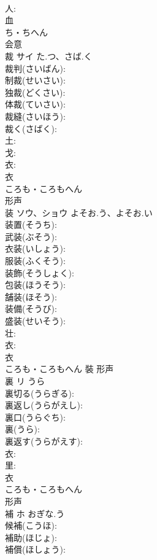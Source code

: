 \documentclass[8pt]{extreport}
\begin{document}
\begin{CJK}{UTF8}{min}
\\	人: 
\\	血	
\\	ち・ちへん	
\\	会意 
\\	裁	サイ	た.つ、さば.く		
\\	裁判(さいばん): 
\\	制裁(せいさい): 
\\	独裁(どくさい): 
\\	体裁(ていさい): 
\\	裁縫(さいほう): 
\\	裁く(さばく): 
\\	土: 
\\	戈: 
\\	衣: 
\\	衣	
\\	ころも・ころもへん	
\\	形声 
\\	装	ソウ、ショウ	よそお.う、よそお.い		
\\	装置(そうち): 
\\	武装(ぶそう): 
\\	衣装(いしょう): 
\\	服装(ふくそう): 
\\	装飾(そうしょく): 
\\	包装(ほうそう): 
\\	舗装(ほそう): 
\\	装備(そうび): 
\\	盛装(せいそう): 
\\	壮: 
\\	衣: 
\\	衣	
\\	ころも・ころもへん	裝	形声 
\\	裏	リ	うら		
\\	裏切る(うらぎる): 
\\	裏返し(うらがえし): 
\\	裏口(うらぐち): 
\\	裏(うら): 
\\	裏返す(うらがえす): 
\\	衣: 
\\	里: 
\\	衣	
\\	ころも・ころもへん	
\\	形声 
\\	補	ホ	おぎな.う		
\\	候補(こうほ): 
\\	補助(ほじょ): 
\\	補償(ほしょう): 

\end{CJK}
\end{document}
